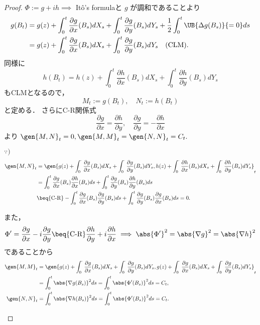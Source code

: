 \documentclass{jsarticle}
\begin{document}
\begin{proof}
    $\Phi:=g+ih\implies $ It\^{o}'s formulaと $g$ が調和であることより
    \begin{align}
        g(B_t)
        &= g(z)
        + \int_0^t\frac{\partial g}{\partial x}(B_s)dX_s
        + \int_0^t\frac{\partial g}{\partial y}(B_s)dY_s
        + \frac{1}{2}\int_0^t\UB{\Delta g(B_s)}{=0}ds \\
        &= g(z)
        + \int_0^t\frac{\partial g}{\partial x}(B_s)dX_s
        + \int_0^t\frac{\partial g}{\partial y}(B_s)dY_s
        \quad\text{(CLM)}.
    \end{align}
    同様に
    $$
    h(B_t)
    =h(z)
    + \int_0^t\frac{\partial h}{\partial x}(B_s)dX_s
    + \int_0^t\frac{\partial h}{\partial y}(B_s)dY_s
    $$
    もCLMとなるので，
    $$
    M_t:= g(B_t), \quad
    N_t:= h(B_t)
    $$
    と定める．
    さらにC-R関係式
    $$
    \frac{\partial g}{\partial x} = \frac{\partial h}{\partial y},\quad
    \frac{\partial g}{\partial y} = -\frac{\partial h}{\partial x}
    $$
    より $\gen{M, N}_t=0, \gen{M, M}_t=\gen{N, N}_t=C_t.$

    \begin{screen}
        $\because)$
        \begin{align}
            \gen{M, N}_t
            &= \gen{g(z)+\int_0^{\cdot}\frac{\partial g}{\partial x}(B_s)dX_s+\int_0^{\cdot}\frac{\partial g}{\partial y}(B_s)dY_s,
            h(z)+\int_0^{\cdot}\frac{\partial h}{\partial x}(B_s)dX_s+\int_0^{\cdot}\frac{\partial h}{\partial y}(B_s)dY_s}_t \\
            &= \int_0^t\frac{\partial g}{\partial x}(B_s)\frac{\partial h}{\partial x}(B_s)ds
            + \int_0^t\frac{\partial g}{\partial y}(B_s)\frac{\partial h}{\partial y}(B_s)ds \\
            &\beq{\text{C-R}} -\int_0^t\frac{\partial g}{\partial x}(B_s)\frac{\partial g}{\partial y}(B_s)ds
            + \int_0^t\frac{\partial g}{\partial y}(B_s)\frac{\partial g}{\partial x}(B_s)ds = 0.
        \end{align}

        また，
        $$
        \Phi'
        = \frac{\partial g}{\partial x} - i\frac{\partial g}{\partial y}
        \beq{\text{C-R}} \frac{\partial h}{\partial y} + i\frac{\partial h}{\partial x}
        \implies \abs{\Phi'}^2
        = \abs{\nabla g}^2
        = \abs{\nabla h}^2
        $$
        であることから
        \begin{align}
            \gen{M, M}_t
            &= \gen{g(z)+\int_0^{\cdot}\frac{\partial g}{\partial x}(B_s)dX_s+\int_0^{\cdot}\frac{\partial g}{\partial y}(B_s)dY_s,
            g(z)+\int_0^{\cdot}\frac{\partial g}{\partial x}(B_s)dX_s+\int_0^{\cdot}\frac{\partial g}{\partial y}(B_s)dY_s}_t \\
            &= \int_0^t\abs{\nabla g(B_s)}^2ds
            = \int_0^t\abs{\Phi'(B_s)}^2ds
            = C_t, \\
            \gen{N, N}_t
            &= \int_0^t\abs{\nabla h(B_s)}^2ds
            = \int_0^t\abs{\Phi'(B_s)}^2ds
            = C_t.
        \end{align}
    \end{screen}


\end{proof}
\end{document}
